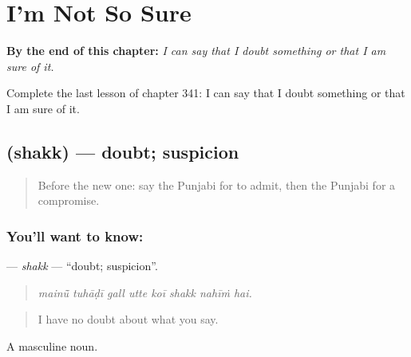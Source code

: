 
\chapter{I'm Not So Sure}
\label{ch:pa-a2-i-m-not-so-sure}

\begin{chapteropening}
\textbf{By the end of this chapter:} \emph{I can say that I doubt something or that I am sure of it.}

Complete the last lesson of chapter 341: I can say that I doubt something or that I am sure of it.
\end{chapteropening}

\section[\texorpdfstring{\pa{ਸ਼ੱਕ} (shakk)}{ਸ਼ੱਕ (shakk)}]{ (shakk) — doubt; suspicion}

\label{lesson:PA-C341-shakk}



\begin{quote}
Before the new one: say the Punjabi for to admit, then the Punjabi for a compromise.
\end{quote}

\subsection*{You'll want to know: }
\textbf{} — \emph{shakk} — \textquotedblleft{}doubt; suspicion\textquotedblright{}.

\begin{quote}
       
\end{quote}

\begin{quote}
\emph{mainū̃ tuhāḍī gall utte koī shakk nahīṁ hai.}
\end{quote}

\begin{quote}
I have no doubt about what you say.
\end{quote}

A masculine noun.


